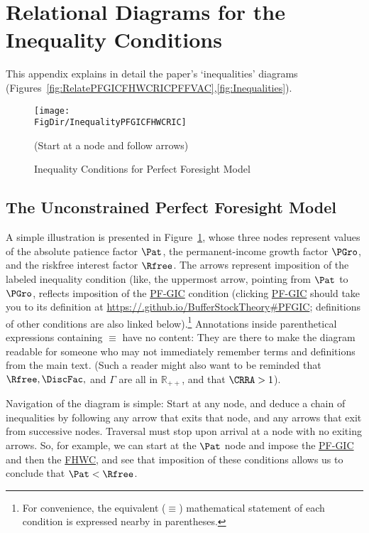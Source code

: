 \documentclass[\econtexRoot/BufferStockTheory]{subfiles}
\newcommand{\BSTlinkTo}{https://\owner.github.io/BufferStockTheory}
\renewcommand{\FHWC}{\href{{\BSTlinkTo}FHWC}{\textrm{FHWC}}}
\newcommand{\PFGICFull}{\href{{\BSTlinkTo}\#PFGIC}{{\BSTlinkTo}\#PFGIC}}
\renewcommand{\FHWC}{\href{{\BSTlinkTo}\#FHWC}{\textrm{FHWC}}}
\renewcommand{\PFGIC}{\href{{\BSTlinkTo}\#PFGIC}{\textrm{PF-GIC}}}
\begin{document}
\hypertarget{ApndxConditionDiagrams}{}

\section{Relational Diagrams for the Inequality Conditions}\label{sec:ApndxConDia}

This appendix explains in detail the paper's `inequalities' diagrams (Figures~\ref{fig:RelatePFGICFHWCRICPFFVAC},\ref{fig:Inequalities}).

\hypertarget{InequalityPFGICFHWCRIC}{}
\begin{figure}
\centering
\texttt{[image: \\FigDir/InequalityPFGICFHWCRIC]}
\caption{Inequality Conditions for Perfect Foresight Model}
\centerline{ (Start at a node and follow arrows)}
\label{fig:InequalityPFGICFHWCRIC}
\end{figure}

\subsection{The Unconstrained Perfect Foresight Model}

A simple illustration is presented in Figure~\ref{fig:InequalityPFGICFHWCRIC}, whose three nodes represent values of the absolute patience factor $\Pat$, the permanent-income growth factor $\PGro$, and the riskfree interest factor $\Rfree$.  The arrows represent imposition of the labeled inequality condition  (like,  the uppermost arrow, pointing from {$\Pat$} to $\PGro$, reflects imposition of the {\PFGIC} condition (clicking {\PFGIC} should take you to its definition at {\PFGICFull}; definitions of other conditions are also linked below).\footnote{For convenience, the equivalent ($\equiv$) mathematical statement of each condition is expressed nearby in parentheses.}  Annotations inside parenthetical expressions containing $\equiv$ have no content: They are there to make the diagram readable for someone who may not immediately remember terms and definitions from the main text.  (Such a reader might also want to be reminded that $\Rfree, \DiscFac, $ and $\Gamma$ are all in $\mathbb{R}_{++}$, and that $\CRRA>1$).

Navigation of the diagram is simple: Start at any node, and deduce a chain of inequalities by following any arrow that exits that node, and any arrows that exit from successive nodes.  Traversal must stop upon arrival at a node with no exiting arrows.  So, for example, we can start at the $\Pat$ node and impose the {\PFGIC} and then the {\FHWC}, and see that imposition of these conditions allows us to conclude that $\Pat < \Rfree$.
\end{document}
